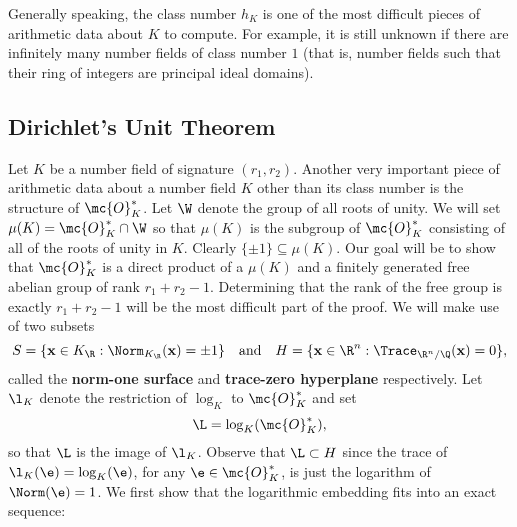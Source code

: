     Generally speaking, the class number $h_{K}$ is one of the most difficult pieces of arithmetic data about $K$ to compute. For example, it is still unknown if there are infinitely many number fields of class number $1$ (that is, number fields such that their ring of integers are principal ideal domains).
  \subsection*{Dirichlet's Unit Theorem}
    Let $K$ be a number field of signature $(r_{1},r_{2})$. Another very important piece of arithmetic data about a number field $K$ other than its class number is the structure of $\mc{O}_{K}^{\ast}$. Let $\W$ denote the group of all roots of unity. We will set $\mu(K) = \mc{O}_{K}^{\ast} \cap \W$ so that $\mu(K)$ is the subgroup of $\mc{O}_{K}^{\ast}$ consisting of all of the roots of unity in $K$. Clearly $\{\pm 1\} \subseteq \mu(K)$. Our goal will be to show that $\mc{O}_{K}^{\ast}$ is a direct product of a $\mu(K)$ and a finitely generated free abelian group of rank $r_{1}+r_{2}-1$. Determining that the rank of the free group is exactly $r_{1}+r_{2}-1$ will be the most difficult part of the proof. We will make use of two subsets
    \[
      S = \{\mathbf{x} \in K_{\R}:\Norm_{K_{\R}}(\mathbf{x}) = \pm 1\} \quad \text{and} \quad H = \{\mathbf{x} \in \R^{n}:\Trace_{\R^{n}/\Q}(\mathbf{x}) = 0\},
    \]
    called the \textbf{norm-one surface} and \textbf{trace-zero hyperplane} respectively. Let $\l_{K}$ denote the restriction of $\log_{K}$ to $\mc{O}_{K}^{\ast}$ and set
    \[
      \L = \log_{K}(\mc{O}_{K}^{\ast}),
    \]
    so that $\L$ is the image of $\l_{K}$. Observe that $\L \subset H$ since the trace of $\l_{K}(\e) = \log_{K}(\e)$, for any $\e \in \mc{O}_{K}^{\ast}$, is just the logarithm of $\Norm(\e) = 1$. We first show that the logarithmic embedding fits into an exact sequence:


